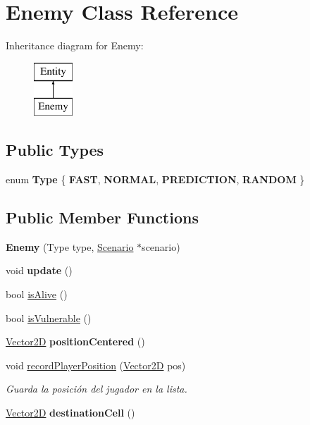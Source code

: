 \hypertarget{class_enemy}{\section{Enemy Class Reference}
\label{class_enemy}
}
Inheritance diagram for Enemy\-:\begin{figure}[H]
\begin{center}
\leavevmode
\includegraphics[height=2.000000cm]{class_enemy}
\end{center}
\end{figure}
\subsection*{Public Types}
\begin{DoxyCompactItemize}
\item 
enum {\bfseries Type} \{ {\bfseries F\-A\-S\-T}, 
{\bfseries N\-O\-R\-M\-A\-L}, 
{\bfseries P\-R\-E\-D\-I\-C\-T\-I\-O\-N}, 
{\bfseries R\-A\-N\-D\-O\-M}
 \}
\end{DoxyCompactItemize}
\subsection*{Public Member Functions}
\begin{DoxyCompactItemize}
\item 
\hypertarget{class_enemy_a0bbb5db5819fcfa1d83f222f38f96c24}{{\bfseries Enemy} (Type type, \hyperlink{class_scenario}{Scenario} $\ast$scenario)}\label{class_enemy_a0bbb5db5819fcfa1d83f222f38f96c24}

\item 
\hypertarget{class_enemy_ad55ee71b5a8c23fbd00b3c368b90cc64}{void {\bfseries update} ()}\label{class_enemy_ad55ee71b5a8c23fbd00b3c368b90cc64}

\item 
bool \hyperlink{class_enemy_a2cce7194016cb90b9e457b3da131fd8a}{is\-Alive} ()
\item 
bool \hyperlink{class_enemy_aaab62fdc7c1ddcc63aca532bed8bf613}{is\-Vulnerable} ()
\item 
\hypertarget{class_enemy_ab45669434f4b9c028c9efde8fbeb27b7}{\hyperlink{class_vector2_d}{Vector2\-D} {\bfseries position\-Centered} ()}\label{class_enemy_ab45669434f4b9c028c9efde8fbeb27b7}

\item 
void \hyperlink{class_enemy_a8d18ac9c202950499f631169e8346c58}{record\-Player\-Position} (\hyperlink{class_vector2_d}{Vector2\-D} pos)
\begin{DoxyCompactList}\small\item\em Guarda la posición del jugador en la lista. \end{DoxyCompactList}\item 
\hypertarget{class_enemy_ab8bd4193b6250a1327d1bf9edc159ded}{\hyperlink{class_vector2_d}{Vector2\-D} {\bfseries destination\-Cell} ()}\label{class_enemy_ab8bd4193b6250a1327d1bf9edc159ded}

\end{DoxyCompactItemize}
